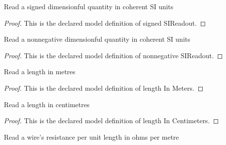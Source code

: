 \begin{definition}
  \label{def:physics:phyx-mini-0978:phyxminiproblems-problemphyxmini0978-signedsireadout}
  Read a signed dimensionful quantity in coherent SI units
\end{definition}
\begin{proof}
  This is the declared model definition of signed SIReadout.
\end{proof}
\begin{definition}
  \label{def:physics:phyx-mini-0978:phyxminiproblems-problemphyxmini0978-nonnegativesireadout}
  Read a nonnegative dimensionful quantity in coherent SI units
\end{definition}
\begin{proof}
  This is the declared model definition of nonnegative SIReadout.
\end{proof}
\begin{definition}
  \label{def:physics:phyx-mini-0978:phyxminiproblems-problemphyxmini0978-lengthinmeters}
  Read a length in metres
\end{definition}
\begin{proof}
  This is the declared model definition of length In Meters.
\end{proof}
\begin{definition}
  \label{def:physics:phyx-mini-0978:phyxminiproblems-problemphyxmini0978-lengthincentimeters}
  Read a length in centimetres
\end{definition}
\begin{proof}
  This is the declared model definition of length In Centimeters.
\end{proof}
\begin{definition}
  \label{def:physics:phyx-mini-0978:phyxminiproblems-problemphyxmini0978-resistanceperlengthinohmspermeter}
  Read a wire's resistance per unit length in ohms per metre
\end{definition}
